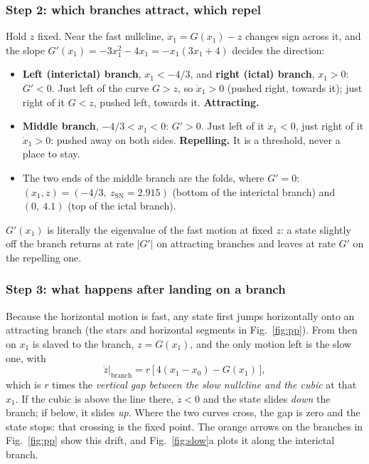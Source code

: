 \documentclass[11pt]{article}
\newcommand{\zsn}{z_{\mathrm{SN}}}
\begin{document}
\subsubsection*{Step 2: which branches attract, which repel}
Hold $z$ fixed. Near the fast nullcline, $\dot x_1 = G(x_1) - z$ changes sign across it, and the slope $G'(x_1) =
-3x_1^2 - 4x_1 = -x_1(3x_1+4)$ decides the direction:
\begin{itemize}
\item \textbf{Left (interictal) branch}, $x_1<-4/3$, and \textbf{right (ictal) branch}, $x_1>0$: $G'<0$. Just left of the
curve $G>z$, so $\dot x_1>0$ (pushed right, towards it); just right of it $G<z$, pushed left, towards it.
\textbf{Attracting.}
\item \textbf{Middle branch}, $-4/3<x_1<0$: $G'>0$. Just left of it $\dot x_1<0$, just right of it $\dot x_1>0$: pushed
away on both sides. \textbf{Repelling.} It is a threshold, never a place to stay.
\item The two ends of the middle branch are the folds, where $G'=0$: $(x_1, z) = (-4/3,\ \zsn = 2.915)$ (bottom of the
interictal branch) and $(0,\ 4.1)$ (top of the ictal branch).
\end{itemize}
$G'(x_1)$ is literally the eigenvalue of the fast motion at fixed $z$: a state slightly off the branch returns at rate
$|G'|$ on attracting branches and leaves at rate $G'$ on the repelling one.

\subsubsection*{Step 3: what happens after landing on a branch}
Because the horizontal motion is fast, any state first jumps horizontally onto an attracting branch (the stars and
horizontal segments in Fig.~\ref{fig:pp}). From then on $x_1$ is slaved to the branch, $z = G(x_1)$, and the only motion
left is the slow one, with
\[
\dot z\big|_{\text{branch}} = r\,\big[\,4(x_1 - x_0) - G(x_1)\,\big],
\]
which is $r$ times the \emph{vertical gap between the slow nullcline and the cubic} at that $x_1$. If the cubic is above
the line there, $\dot z<0$ and the state slides \emph{down} the branch; if below, it slides \emph{up}. Where the two curves
cross, the gap is zero and the state stops: that crossing is the fixed point. The orange arrows on the branches in
Fig.~\ref{fig:pp} show this drift, and Fig.~\ref{fig:slow}a plots it along the interictal branch.
\end{document}
